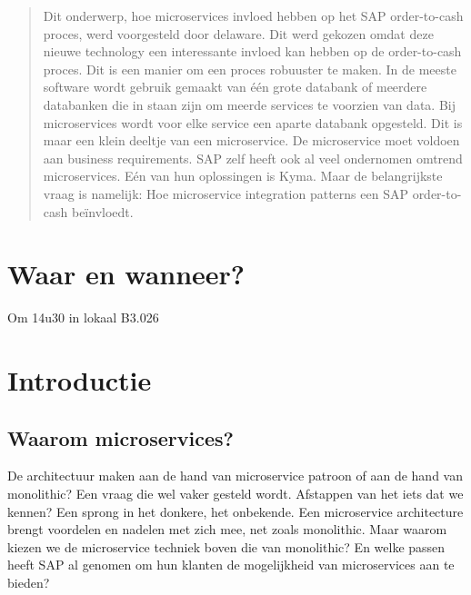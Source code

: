 \documentclass[a0,portrait]{a0poster}
\begin{document}
\begin{multicols}{2} %


\color{HoGentAccent1} %

\begin{abstract}
Dit onderwerp, hoe microservices invloed hebben op het SAP order-to-cash proces, werd voorgesteld door delaware. Dit werd gekozen omdat deze nieuwe technology een interessante invloed kan hebben op de order-to-cash proces. Dit is een manier om een proces robuuster te maken. In de meeste software wordt gebruik gemaakt van één grote databank of meerdere databanken
die in staan zijn om meerde services te voorzien van data. Bij microservices wordt voor elke service een aparte databank opgesteld. Dit is maar een klein deeltje van een microservice. De microservice moet voldoen aan business requirements. SAP zelf heeft ook al veel ondernomen omtrend microservices. Eén van hun oplossingen is Kyma. Maar de belangrijkste vraag is namelijk: Hoe microservice integration patterns een SAP order-to-cash beïnvloedt. \end{abstract}
\color{Black} %
\color{HoGentAccent1} 
\section{Waar en wanneer?}
Om 14u30 in lokaal B3.026

\color{HoGentAccent1} 
\section*{Introductie}
\color{black}
\color{black}
\subsection{Waarom microservices?}
De architectuur maken aan de hand van microservice patroon of aan de hand van monolithic? Een vraag die wel vaker gesteld wordt. Afstappen van het iets dat we kennen? Een sprong in het donkere, het onbekende. Een microservice architecture brengt voordelen en nadelen met zich mee, net zoals monolithic. Maar waarom kiezen we de microservice techniek boven die van monolithic? En welke passen heeft SAP al genomen om hun klanten de mogelijkheid van microservices aan te bieden?


\end{multicols}
\end{document}

